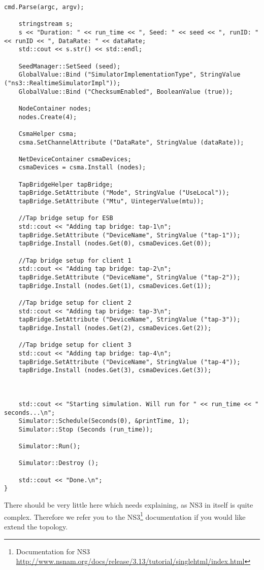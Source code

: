 \begin{lstlisting}[frame=single, caption={System-test-2 Topology}, label=mobiemu:topology, breaklines=true]
    cmd.Parse(argc, argv);
   
    stringstream s;
    s << "Duration: " << run_time << ", Seed: " << seed << ", runID: " << runID << ", DataRate: " << dataRate;
    std::cout << s.str() << std::endl;

    SeedManager::SetSeed (seed);
    GlobalValue::Bind ("SimulatorImplementationType", StringValue ("ns3::RealtimeSimulatorImpl"));
    GlobalValue::Bind ("ChecksumEnabled", BooleanValue (true));
   
    NodeContainer nodes;
    nodes.Create(4);
   
    CsmaHelper csma;
    csma.SetChannelAttribute ("DataRate", StringValue (dataRate));
   
    NetDeviceContainer csmaDevices;
    csmaDevices = csma.Install (nodes);
   
    TapBridgeHelper tapBridge;
    tapBridge.SetAttribute ("Mode", StringValue ("UseLocal"));
    tapBridge.SetAttribute ("Mtu", UintegerValue(mtu));
   
    //Tap bridge setup for ESB
    std::cout << "Adding tap bridge: tap-1\n";
    tapBridge.SetAttribute ("DeviceName", StringValue ("tap-1"));
    tapBridge.Install (nodes.Get(0), csmaDevices.Get(0));
   
    //Tap bridge setup for client 1
    std::cout << "Adding tap bridge: tap-2\n";
    tapBridge.SetAttribute ("DeviceName", StringValue ("tap-2"));
    tapBridge.Install (nodes.Get(1), csmaDevices.Get(1));
   
    //Tap bridge setup for client 2
    std::cout << "Adding tap bridge: tap-3\n";
    tapBridge.SetAttribute ("DeviceName", StringValue ("tap-3"));
    tapBridge.Install (nodes.Get(2), csmaDevices.Get(2));

    //Tap bridge setup for client 3
    std::cout << "Adding tap bridge: tap-4\n";
    tapBridge.SetAttribute ("DeviceName", StringValue ("tap-4"));
    tapBridge.Install (nodes.Get(3), csmaDevices.Get(3));
   
   
   
    std::cout << "Starting simulation. Will run for " << run_time << " seconds...\n";  
    Simulator::Schedule(Seconds(0), &printTime, 1);
    Simulator::Stop (Seconds (run_time));

    Simulator::Run();

    Simulator::Destroy ();

    std::cout << "Done.\n";
}
\end{lstlisting}

There should be very little here which needs explaining, as NS3 in itself is quite complex. Therefore we refer you to the NS3\footnote{Documentation for NS3 \url{http://www.nsnam.org/docs/release/3.13/tutorial/singlehtml/index.html}} documentation if you would like extend the topology.
